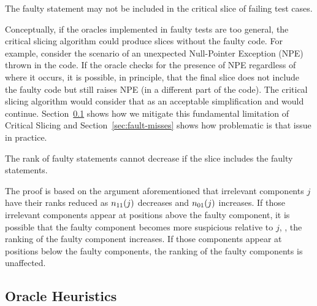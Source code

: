 \documentclass{article}
\begin{document}
\begin{theorem}
  The faulty statement may not be included in the critical slice of
  failing test cases.
\end{theorem}

Conceptually, if the oracles implemented in faulty tests are too
general, the critical slicing algorithm could produce slices without
the faulty code. For example, consider the scenario of an unexpected
Null-Pointer Exception (NPE) thrown in the code. If the oracle checks
for the presence of NPE regardless of where it occurs, it is possible,
in principle, that the final slice does not include the faulty code
but still raises NPE (in a different part of the code). The critical
slicing algorithm would consider that as an acceptable simplification
and would continue. Section~\ref{sec:oracleheuristics} shows how we
mitigate this fundamental limitation of Critical Slicing and
Section~\ref{sec:fault-misses} shows how problematic is that issue in
practice.


\begin{theorem}
  The rank of faulty statements cannot decrease if the slice includes
  the faulty statements.
\end{theorem}

The proof is based on the argument aforementioned that irrelevant
components $j$ have their ranks reduced as $n_{11}(j)$ decreases and
$n_{01}(j)$ increases. If those irrelevant components appear at positions
above the faulty component, it is possible that the faulty component
becomes more suspicious relative to $j$, \ie{}, the ranking of the
faulty component increases. If those components appear at positions
below the faulty components, the ranking of the faulty components is
unaffected.


\subsection{Oracle Heuristics}
\label{sec:oracleheuristics}
\end{document}
